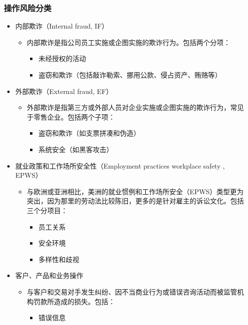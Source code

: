 \subsubsection{操作风险分类}
\begin{itemize}
\item 内部欺诈（Internal fraud, IF）
    \begin{itemize}
    \item 内部欺诈是指公司员工实施或企图实施的欺诈行为。包括两个分项：
        \begin{itemize}
        \item 未经授权的活动
        \item 盗窃和欺诈（包括敲诈勒索、挪用公款、侵占资产、贿赂等）
        \end{itemize}
    \end{itemize}
\item 外部欺诈（External fraud, EF）
    \begin{itemize}
    \item 外部欺诈是指第三方或外部人员对企业实施或企图实施的欺诈行为，常见于零售企业。包括两个子项：
        \begin{itemize}
        \item 盗窃和欺诈（如支票拼凑和伪造）
        \item 系统安全（如黑客攻击）
        \end{itemize}
    \end{itemize}
\item 就业政策和工作场所安全性（Employment practices workplace safety , EPWS）
    \begin{itemize}
    \item 与欧洲或亚洲相比，美洲的就业惯例和工作场所安全（EPWS）类型更为突出，因为那里的劳动法比较陈旧，更多的是针对雇主的诉讼文化。包括三个分项目：
        \begin{itemize}
        \item 员工关系
        \item 安全环境
        \item 多样性和歧视
        \end{itemize}
    \end{itemize}
\item 客户、产品和业务操作
    \begin{itemize}
    \item 与客户和交易对手发生纠纷、因不当商业行为或错误咨询活动而被监管机构罚款所造成的损失。包括：
        \begin{itemize}
        \item 错误信息

\end{itemize}
\end{itemize}
\end{itemize}
